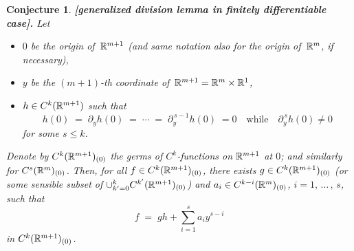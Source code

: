 \documentclass[11pt]{article}
\numberwithin{equation}{subsection}
\newtheorem{sconjecture}[stheorem]{Conjecture}
\begin{document}
\begin{sconjecture} {\bf [generalized division lemma in finitely differentiable case].}
 Let
    \begin{itemize}
	  \item[\LARGE $\cdot$]
       $0$ be the origin of $\,{\Bbb R}^{m+1}$
	   (and same notation also for the origin of $\,{\Bbb R}^m$, if necessary),
	
	  \item[\LARGE $\cdot$]
       $y$ be the $(m+1)$-th coordinate of $\,{\Bbb R}^{m+1}={\Bbb R}^m\times {\Bbb R}^1$,
	
	  \item[\LARGE $\cdot$]
       $h\in C^k({\Bbb R}^{m+1}) $ such that
         $$
           h(0)\;=\; \partial_yh(0)\;=\; \cdots\; =\; \partial_y^{\,s-1}h(0)\;=0
		    \hspace{1em}\mbox{while}\hspace{1em}
		   \partial_y^{\,s}h(0)\ne 0
         $$
		 for some $s\le k$.
   \end{itemize}
  Denote by $C^k({\Bbb R}^{m+1})_{(0)}$
      the germs of $C^k$-functions on ${\Bbb R}^{m+1}$ at $0$;
	 and similarly for $C^s({\Bbb R}^m)_{(0)}$.
 Then,
   for all $f\in C^k({\Bbb R}^{m+1})_{(0)}$,
   there exists $g\in C^k({\Bbb R}^{m+1})_{(0)}$
         (or some sensible subset of
		     $\cup_{k^{\prime}=0}^kC^{k^{\prime}}({\Bbb R}^{m+1})_{(0)}$)
     and $a_i\in C^{k-i}({\Bbb R}^m)_{(0)}$, $i=1,\,\ldots\,,\,s$,
   such that
    $$
	    f\; =\;  gh + \sum_{i=1}^s a_iy^{s-i}
	$$
	in $C^k({\Bbb R}^{m+1})_{(0)}$.
\end{sconjecture}
\end{document}
